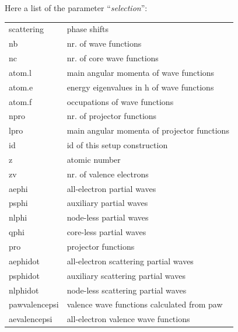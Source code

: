 \documentclass[final,12pt]{article}
\begin{document}
{{{{{{Here a list of the parameter ``\textit{selection}'': 
\begin{center}
\begin{tabular}{ll}
 scattering       & phase shifts                                             \\
 nb               & nr. of wave functions                                    \\
 nc               & nr. of core wave functions                               \\
 atom.l           & main angular momenta of wave functions                   \\
 atom.e           & energy eigenvalues in h of wave functions                \\
 atom.f           & occupations of wave functions                            \\
 npro             & nr. of projector functions                               \\
 lpro             & main angular momenta of projector functions              \\
 id               & id of this setup construction                            \\
 z                & atomic number                                            \\
 zv               & nr. of valence electrons                                 \\
 aephi            & all-electron partial waves                               \\
 psphi            & auxiliary partial waves                                  \\
 nlphi            & node-less partial waves                                  \\
 qphi             & core-less partial waves                                  \\
 pro              & projector functions                                      \\
 aephidot         & all-electron scattering partial waves                    \\
 psphidot         & auxiliary scattering partial waves                       \\
 nlphidot         & node-less scattering partial waves                       \\
 pawvalencepsi    & valence wave functions calculated from paw               \\
 aevalencepsi     & all-electron valence wave functions                      \\

\end{tabular}
\end{center}}}}}}}
\end{document}
